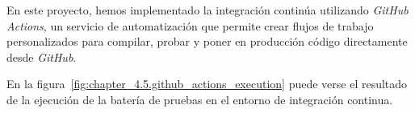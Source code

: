 En este proyecto, hemos implementado la integración continúa utilizando \textit{GitHub Actions}, un servicio de
automatización que permite crear flujos de trabajo personalizados para compilar, probar y poner en producción código
directamente desde \textit{GitHub}.

En la figura~\ref{fig:chapter_4.5.github_actions_execution} puede verse el resultado de la ejecución de la batería de
pruebas en el entorno de integración continua.